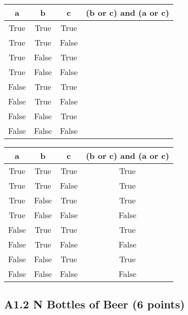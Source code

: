 \begin{center}
    \begin{tabular}{| c | c | c | c |}
    \hline
    \textbf{a} & \textbf{b} & \textbf{c} & \textbf{(b or c) and (a or c)} \\
    \hline
    True & True & True &  \\
    \hline
    True & True & False &  \\
    \hline
    True & False & True &  \\
    \hline
    True & False & False &  \\
    \hline
    False & True & True &  \\
    \hline
    False & True & False &  \\
    \hline
    False & False & True &  \\
    \hline
    False & False & False &  \\
    \hline
    \end{tabular}
\end{center}


\vspace{1em}


\begin{solution}
\vspace{1em}
    \begin{center}
        \begin{tabular}{| c | c | c | c |}
        \hline
        \textbf{a} & \textbf{b} & \textbf{c} & \textbf{(b or c) and (a or c)} \\
        \hline
        True & True & True & True \\
        \hline
        True & True & False & True \\
        \hline
        True & False & True & True \\
        \hline
        True & False & False & False \\
        \hline
        False & True & True & True \\
        \hline
        False & True & False & False \\
        \hline
        False & False & True & True \\
        \hline
        False & False & False & False \\
        \hline
        \end{tabular}
    \end{center}
\end{solution}



\subsection*{A1.2 N Bottles of Beer (6 points)}

